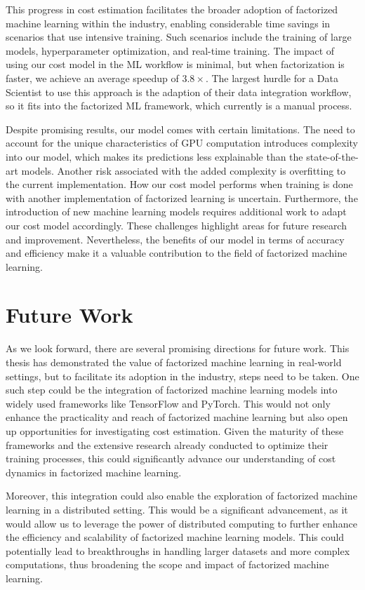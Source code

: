 This progress in cost estimation facilitates the broader adoption of factorized machine learning within the industry, enabling considerable time savings in scenarios that use intensive training. Such scenarios include the training of large models, hyperparameter optimization, and real-time training. The impact of using our cost model in the ML workflow is minimal, but when factorization is faster, we achieve an average speedup of $3.8\times$. The largest hurdle for a Data Scientist to use this approach is the adaption of their data integration workflow, so it fits into the factorized ML framework, which currently is a manual process.

Despite promising results, our model comes with certain limitations. The need to account for the unique characteristics of GPU computation introduces complexity into our model, which makes its predictions less explainable than the state-of-the-art models. Another risk associated with the added complexity is overfitting to the current implementation. How our cost model performs when training is done with another implementation of factorized learning is uncertain. Furthermore, the introduction of new machine learning models requires additional work to adapt our cost model accordingly. These challenges highlight areas for future research and improvement. Nevertheless, the benefits of our model in terms of accuracy and efficiency make it a valuable contribution to the field of factorized machine learning.

\section{Future Work}
\label{sec:7-future-work}
As we look forward, there are several promising directions for future work. This thesis has demonstrated the value of factorized machine learning in real-world settings, but to facilitate its adoption in the industry, steps need to be taken. One such step could be the integration of factorized machine learning models into widely used frameworks like TensorFlow and PyTorch. This would not only enhance the practicality and reach of factorized machine learning but also open up opportunities for investigating cost estimation. Given the maturity of these frameworks and the extensive research already conducted to optimize their training processes, this could significantly advance our understanding of cost dynamics in factorized machine learning.

Moreover, this integration could also enable the exploration of factorized machine learning in a distributed setting. This would be a significant advancement, as it would allow us to leverage the power of distributed computing to further enhance the efficiency and scalability of factorized machine learning models. This could potentially lead to breakthroughs in handling larger datasets and more complex computations, thus broadening the scope and impact of factorized machine learning.


